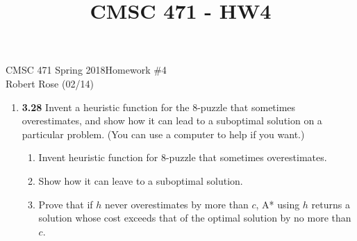 \documentclass[12pt]{article}
\title{CMSC 471 - HW4}
\begin{document}
CMSC 471 Spring 2018\hfill Homework \#4\\
Robert Rose (02/14)

\hrulefill

\begin{enumerate}
\item \textbf{3.28} Invent a heuristic function for the 8-puzzle that sometimes overestimates, and show how it can lead to a suboptimal solution on a particular problem. (You can use a computer to help if you want.)
  \begin{enumerate}
  \item Invent heuristic function for 8-puzzle that sometimes overestimates.
  \item Show how it can leave to a suboptimal solution.
  \item Prove that if $h$ never overestimates by more than $c$, A* using $h$ returns a solution whose cost exceeds that of the optimal solution by no more than $c$.
  \end{enumerate}
\newpage

\end{enumerate}
\end{document}
